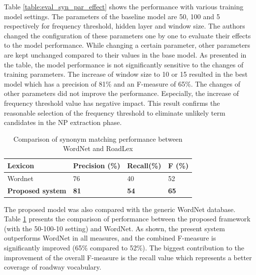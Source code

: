 \documentclass[Journal, BackFigs, DoubleSpace]{ascelike}%
\begin{document}
%
Table \ref{table:eval_syn_par_effect} shows the performance with various training model settings. The parameters of the baseline model are 50, 100 and 5 respectively for frequency threshold, hidden layer and window size. The authors changed the configuration of these parameters one by one to evaluate their effects to the model performance. While changing a certain parameter, other parameters are kept unchanged compared to their values in the base model. As presented in the table, the model performance is not significantly sensitive to the changes of training parameters. The increase of window size to 10 or 15 resulted in the best model which has a precision of 81\% and an F-measure of 65\%. The changes of other parameters did not improve the performance. Especially, the increase of frequency threshold value has negative impact. This result confirms the reasonable selection of the frequency threshold to eliminate unlikely term candidates in the NP extraction phase.
%
\begin{table} [b] 
	\caption{Comparison of synonym matching performance between WordNet and RoadLex}
	\label{table:eval_syn_vs_Wordnet}
	\centering
	\small
	\renewcommand{\arraystretch}{1.25}
	\begin{tabular}{l l l l }
		\hline
		\hline
		\textbf{Lexicon} & \textbf{Precision (\%)}  & \textbf{Recall(\%)} & \textbf{F (\%)}\\
		\hline
		Wordnet	&76 	&40 	&52\\	
		\textbf{Proposed system} &\textbf{81}	&\textbf{54}		&\textbf{65}\\	
		\hline
		\hline
	\end{tabular}
	\normalsize
\end{table}
\par
The proposed model was also compared with the generic WordNet database. Table \ref{table:eval_syn_vs_Wordnet} presents the comparison of performance between the proposed framework (with the 50-100-10 setting) and WordNet. As shown, the present system outperforms WordNet in all measures, and the combined F-measure is significantly improved (65\% compared to 52\%). The biggest contribution to the improvement of the overall F-measure is the recall value which represents a better coverage of roadway vocabulary. 
\end{document}
